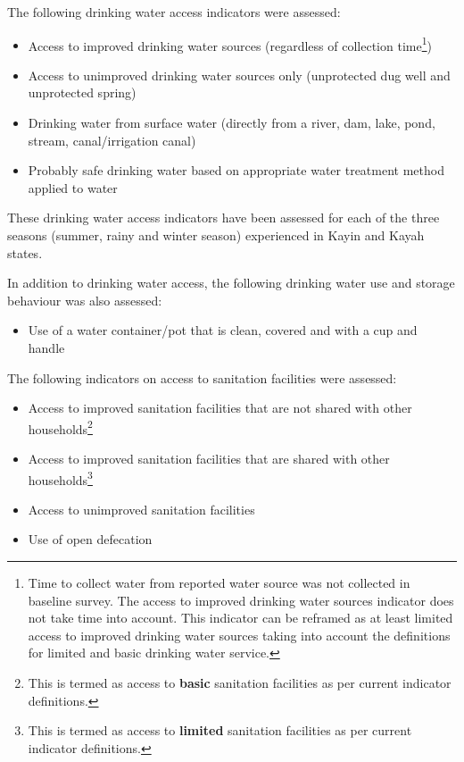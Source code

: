 \documentclass[12pt,a4paper]{article}
\providecommand{\tightlist}{%
  \setlength{\itemsep}{0pt}\setlength{\parskip}{0pt}}
\let\rmarkdownfootnote\footnote%
\def\footnote{\protect\rmarkdownfootnote}
\begin{document}
The following drinking water access indicators were assessed:

\begin{itemize}
\item
  Access to improved drinking water sources (regardless of collection time\footnote{Time to collect water from reported water source was not collected in baseline survey. The access to improved drinking water sources indicator does not take time into account. This indicator can be reframed as at least limited access to improved drinking water sources taking into account the definitions for limited and basic drinking water service.})
\item
  Access to unimproved drinking water sources only (unprotected dug well and unprotected spring)
\item
  Drinking water from surface water (directly from a river, dam, lake, pond, stream, canal/irrigation canal)
\item
  Probably safe drinking water based on appropriate water treatment method applied to water
\end{itemize}

These drinking water access indicators have been assessed for each of the three seasons (summer, rainy and winter season) experienced in Kayin and Kayah states.

In addition to drinking water access, the following drinking water use and storage behaviour was also assessed:

\begin{itemize}
\tightlist
\item
  Use of a water container/pot that is clean, covered and with a cup and handle
\end{itemize}

The following indicators on access to sanitation facilities were assessed:

\begin{itemize}
\item
  Access to improved sanitation facilities that are not shared with other households\footnote{This is termed as access to \textbf{basic} sanitation facilities as per current indicator definitions.}
\item
  Access to improved sanitation facilities that are shared with other households\footnote{This is termed as access to \textbf{limited} sanitation facilities as per current indicator definitions.}
\item
  Access to unimproved sanitation facilities
\item
  Use of open defecation
\end{itemize}
\end{document}
